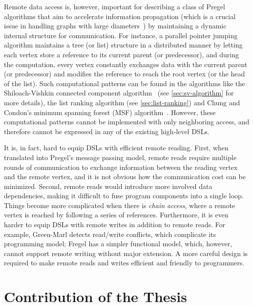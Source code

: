 \documentclass{sokendai_thesis} %
\begin{document}
Remote data access is, however, important for describing a class of Pregel algorithms that aim to accelerate information propagation (which is a crucial issue in handling graphs with large diameters~\cite{connectivity}) by maintaining a dynamic internal structure for communication.
For instance, a parallel pointer jumping algorithm maintains a tree (or list) structure in a distributed manner by letting each vertex store a reference to its current parent (or predecessor), and during the computation, every vertex constantly exchanges data with the current parent (or predecessor) and modifies the reference to reach the root vertex (or the head of the list).
Such computational patterns can be found in the algorithms like the Shiloach-Vishkin connected component algorithm~\cite{connectivity} (see \autoref{sec:sv-algorithm} for more details), the list ranking algorithm (see \autoref{sec:list-ranking}) and Chung and Condon's minimum spanning forest (MSF) algorithm~\cite{boruvka}.
However, these computational patterns cannot be implemented with only neighboring access, and therefore cannot be expressed in any of the existing high-level DSLs.

It is, in fact, hard to equip DSLs with efficient remote reading.
First, when translated into Pregel's message passing model, remote reads require multiple rounds of communication to exchange information between the reading vertex and the remote vertex, and it is not obvious how the communication cost can be minimized.
Second, remote reads would introduce more involved data dependencies, making it difficult to fuse program components into a single loop.
Things become more complicated when there is \emph{chain access}, where a remote vertex is reached by following a series of references.
Furthermore, it is even harder to equip DSLs with remote writes in addition to remote reads.
For example, Green-Marl detects read/write conflicts, which complicate its programming model; Fregel has a simpler functional model, which, however, cannot support remote writing without major extension.
A more careful design is required to make remote reads and writes efficient and friendly to programmers.

\section{Contribution of the Thesis}
\end{document}
